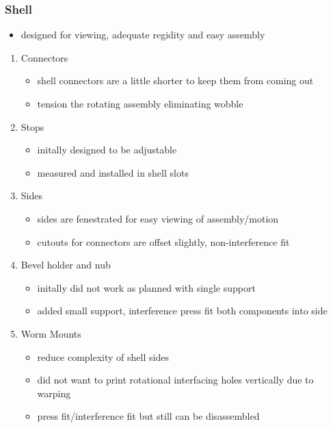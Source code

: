 \documentclass[11pt]{article}
\begin{document}
\subsubsection{Shell}
\label{sec:org52260d1}
\begin{itemize}
\item designed for viewing, adequate regidity and easy assembly
\end{itemize}

\begin{enumerate}
\item Connectors
\label{sec:org04eae0c}
\begin{itemize}
\item shell connectors are a little shorter to keep them from coming out
\item tension the rotating assembly eliminating wobble
\end{itemize}

\item Stops
\label{sec:org62caf10}
\begin{itemize}
\item initally designed to be adjustable
\item measured and installed in shell slots
\end{itemize}

\item Sides
\label{sec:orge09ad20}
\begin{itemize}
\item sides are fenestrated for easy viewing of assembly/motion
\item cutouts for connectors are offset slightly, non-interference fit
\end{itemize}

\item Bevel holder and nub
\label{sec:org01972ce}
\begin{itemize}
\item initally did not work as planned with single support
\item added small support, interference press fit both components into side
\end{itemize}

\item Worm Mounts
\label{sec:org4f0e220}
\begin{itemize}
\item reduce complexity of shell sides
\item did not want to print rotational interfacing holes vertically due to warping
\item press fit/interference fit but still can be disassembled
\end{itemize}
\end{enumerate}
\end{document}
